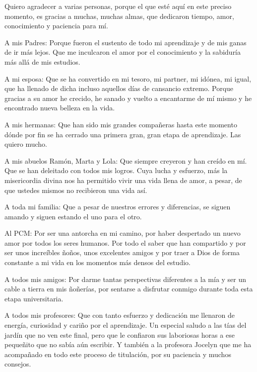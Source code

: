 \begin{thanks}
      
    Quiero agradecer a varias personas, porque el que esté aquí en este preciso momento, es gracias a muchas, muchas almas, que dedicaron tiempo, amor, conocimiento y paciencia para mí.

    \par A mis Padres: Porque fueron el sustento de todo mi aprendizaje y de mis ganas de ir más lejos. Que me inculcaron el amor por el conocimiento y la sabiduría más allá de mis estudios.

    \par A mi esposa: Que se ha convertido en mi tesoro, mi partner, mi idónea, mi igual, que ha llenado de dicha incluso aquellos días de cansancio extremo. Porque gracias a su amor he crecido, he sanado y vuelto a encantarme de mí mismo y he encontrado nueva belleza en la vida.

    \par A mis hermanas: Que han sido mis grandes compañeras hasta este momento dónde por fin se ha cerrado una primera gran, gran etapa de aprendizaje. Las quiero mucho.

    \par A mis abuelos Ramón, Marta y Lola: Que siempre creyeron y han creído en mí. Que se han deleitado con todos mis logros. Cuya lucha y esfuerzo, más la misericordia divina nos ha permitido vivir una vida llena de amor, a pesar, de que ustedes mismos no recibieron una vida así.

    \par A toda mi familia: Que a pesar de nuestros errores y diferencias, se siguen amando y siguen estando el uno para el otro.

    \par Al PCM: Por ser una antorcha en mi camino, por haber despertado un nuevo amor por todos los seres humanos. Por todo el saber que han compartido y por ser unos increíbles \guillemotleft ñoños\guillemotright, unos excelentes amigos y por traer a Dios de forma constante a mi vida en los momentos más densos del estudio.

    \par A todos mis amigos: Por darme tantas perspectivas diferentes a la mía y ser un cable a tierra en mis \guillemotleft ñoñerías\guillemotright, por sentarse a disfrutar conmigo durante toda esta etapa universitaria.

    \par A todos mis profesores: Que con tanto esfuerzo y dedicación me llenaron de energía, curiosidad y cariño por el aprendizaje. Un especial saludo a las tías del jardín que no ven este final, pero que le confiaron sus laboriosas horas a ese pequeñito que no sabía aún escribir. Y también a la profesora Jocelyn que me ha acompañado en todo este proceso de titulación, por su paciencia y muchos consejos.

\end{thanks}